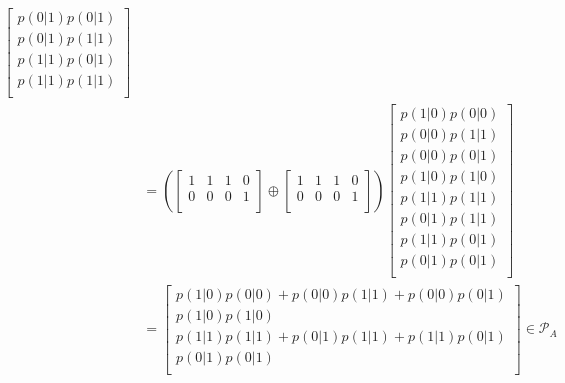 \documentclass[10pt, a4paper]{article}
\numberwithin{equation}{section} %
\theoremstyle{definition}
\theoremstyle{plain}
\newcommand{\?}{\mathrel{?}} %
\newcommand{\sP}{\mathcal{P}}
\begin{document}
\begin{align*}
\begin{bmatrix}
                      p(0|1) p(0|1) \\ p(0|1) p(1|1) \\ p(1|1) p(0|1) \\ p(1|1) p(1|1) \\ 
                    \end{bmatrix} \\
                                                  &=
                                                  \left( \begin{bmatrix}
                                                      1 & 1 & 1 & 0 \\
                                                      0 & 0 & 0 & 1 \\
                                                      \end{bmatrix} \oplus \begin{bmatrix}
                                                      1 & 1 & 1 & 0 \\
                                                      0 & 0 & 0 & 1 \\
                                                  \end{bmatrix} \right)
                                                  \begin{bmatrix} 
                                                    p(1|0) p(0|0) \\ p(0|0) p(1|1) \\ p(0|0) p(0|1) \\ p(1|0) p(1|0) \\
                                                    p(1|1) p(1|1) \\ p(0|1) p(1|1) \\ p(1|1) p(0|1) \\ p(0|1) p(0|1) \\ 
                                                  \end{bmatrix} \\
                                                  &=
                                                  \begin{bmatrix}
                                                    p(1|0) p(0|0) + p(0|0) p(1|1) + p(0|0) p(0|1) \\ p(1|0) p(1|0) \\
                                                    p(1|1) p(1|1) + p(0|1) p(1|1) + p(1|1) p(0|1) \\ p(0|1) p(0|1) \\ 
                                                  \end{bmatrix} \in \sP_A
                  \end{align*}
\end{document}
